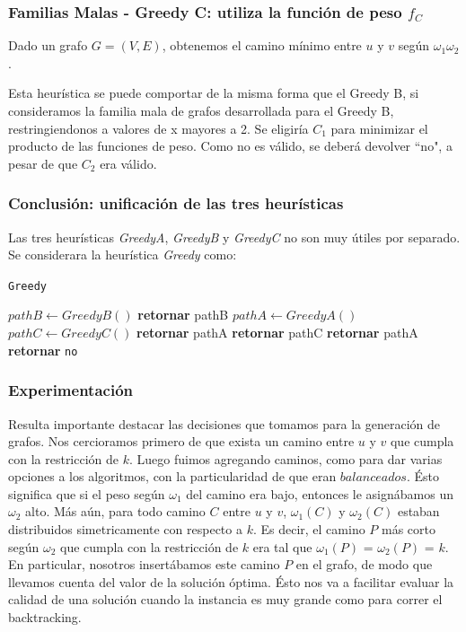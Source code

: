 \clearpage
\subsubsection{Familias Malas - Greedy C: utiliza la función de peso $f_{C}$}\label{subsubsec:greedy-c}
Dado un grafo $G = (V,E)$, obtenemos el camino m\'inimo entre $u$ y $v$ seg\'un $\omega_1\omega_2$. 

Esta heurística se puede comportar de la misma forma que el Greedy B, si consideramos la familia mala de grafos desarrollada para el Greedy B,
restringiendonos a valores de x mayores a 2. Se eligiría $C_1$  para minimizar el producto de las funciones de peso. Como no es válido,
se deberá devolver ``no", a pesar de que $C_2$ era válido. 

\subsubsection{Conclusión: unificación de las tres heurísticas}
Las tres heurísticas \textit{GreedyA}, \textit{GreedyB} y \textit{GreedyC} no son muy útiles por separado. Se considerara la heurística \textit{Greedy} como:

\begin{algorithm}
    \caption{\texttt{Greedy}}
\begin{algorithmic}[1]
    \State $pathB \leftarrow GreedyB()$
        \State \textbf{retornar} pathB
    \EndIf
    \State $pathA \leftarrow GreedyA()$
    \State $pathC \leftarrow GreedyC()$
            \State \textbf{retornar} pathA
        \Else
            \State \textbf{retornar} pathC
        \EndIf
    \EndIf
        \State \textbf{retornar} pathA
    \Else
        \State \textbf{retornar} \texttt{no}
    \EndIf
\end{algorithmic}
\end{algorithm}

\subsubsection{Experimentación}
Resulta importante destacar las decisiones que tomamos para la generación de grafos. Nos cercioramos primero de que exista un camino entre $u$ y
$v$ que cumpla con la restricción de $k$. Luego fuimos agregando caminos, como para dar varias opciones a los algoritmos, con la particularidad
de que eran $balanceados$. Ésto significa que si el peso según $\omega_1$ del camino era bajo, entonces le asignábamos un $\omega_2$ alto.
Más aún, para todo camino $C$ entre $u$ y $v$, $\omega_1(C)$ y $\omega_2(C)$ estaban distribuidos simetricamente con respecto a $k$.
Es decir, el camino $P$ más corto según $\omega_2$ que cumpla con la restricción de $k$ era tal que $\omega_1(P)$ = $\omega_2(P)$ = $k$.
En particular, nosotros insertábamos este camino $P$ en el grafo, de modo que llevamos cuenta del valor de la solución óptima. Ésto nos va a
facilitar evaluar la calidad de una solución cuando la instancia es muy grande como para correr el backtracking.


